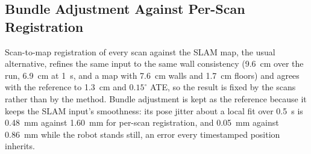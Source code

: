 \subsection{Bundle Adjustment Against Per-Scan Registration}
Scan-to-map registration of every scan against the SLAM map, the usual
alternative, refines the same input to the same wall consistency
(\SI{9.6}{\centi\metre} over the run, \SI{6.9}{\centi\metre} at
\SI{1}{\second}, and a map with \SI{7.6}{\centi\metre} walls and
\SI{1.7}{\centi\metre} floors) and agrees with the reference to \SI{1.3}{\centi\metre}
and $0.15^\circ$ ATE, so the result is fixed by the scans rather than by
the method. Bundle adjustment is kept as the reference because it keeps
the SLAM input's smoothness: its pose jitter about a local fit over
\SI{0.5}{\second} is \SI{0.48}{\milli\metre} against
\SI{1.60}{\milli\metre} for per-scan registration, and
\SI{0.05}{\milli\metre} against \SI{0.86}{\milli\metre} while the robot
stands still, an error every timestamped position inherits.
